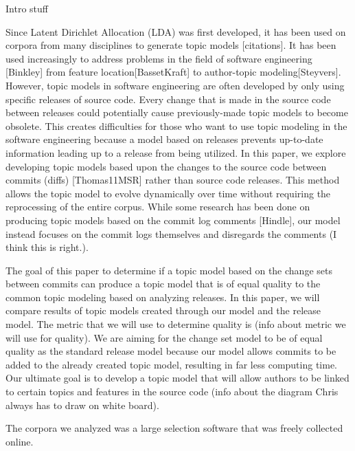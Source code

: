 
Intro stuff \cite{Blei2003}

Since Latent Dirichlet Allocation (LDA) \cite{Blei2003} was first developed, it has been used on corpora from many disciplines to generate topic models [citations]. It has been used increasingly to address problems in the field of software engineering [Binkley] from feature location[BassetKraft] to author-topic modeling[Steyvers]. However, topic models in software engineering are often developed by only using specific releases of source code. Every change that is made in the source code between releases could potentially cause previously-made topic models to become obsolete. This creates difficulties for those who want to use topic modeling in the software engineering because a model based on releases prevents up-to-date information leading up to a release from being utilized. In this paper, we explore developing topic models based upon the changes to the source code between commits (diffs) [Thomas11MSR] rather than source code releases. This method allows the topic model to evolve dynamically over time without requiring the reprocessing of the entire corpus. While some research has been done on producing topic models based on the commit log comments [Hindle], our model instead focuses on the commit logs themselves and disregards the comments (I think this is right.).

The goal of this paper to determine if a topic model based on the change sets between commits can produce a topic model that is of equal quality to the common topic modeling based on analyzing releases. In this paper, we will compare results of topic models created through our model and the release model. The metric that we will use to determine quality is (info about metric we will use for quality). We are aiming for the change set model to be of equal quality as the standard release model because our model allows commits to be added to the already created topic model, resulting in far less computing time. Our ultimate goal is to develop a topic model that will allow authors to be linked to certain topics and features in the source code (info about the diagram Chris always has to draw on white board).

The corpora we analyzed was a large selection software that was freely collected online.